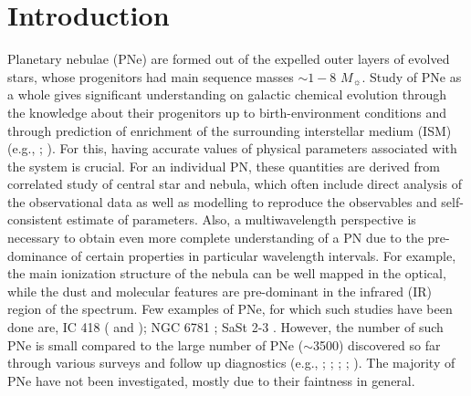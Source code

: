 \documentclass[a4paper,fleqn,usenatbib]{mnras}
\begin{document}
\section{Introduction}
Planetary nebulae (PNe) are formed out of the expelled outer layers of evolved stars, whose progenitors had 
main sequence masses $\sim1-8$ $M_{\sun}$. Study of PNe as a whole gives significant understanding on galactic chemical evolution through the knowledge about their progenitors up to birth-environment conditions and through prediction of enrichment of the surrounding interstellar medium (ISM) (e.g., \citealt{2006ApJ...651..898S}; \citealt{2016MNRAS.461..542G}). For this, having accurate values of physical parameters associated with the system is crucial. For an individual PN, these quantities are derived from correlated study of central star and nebula, which often include direct analysis of the observational data as well as modelling to reproduce the observables and self-consistent estimate of parameters. Also, a multiwavelength perspective is necessary to obtain even more complete understanding of a PN due to the pre-dominance of certain properties in particular wavelength intervals. For example, the main ionization structure of the nebula can be well mapped in the optical, while the dust and molecular features are pre-dominant in the infrared (IR) region of the spectrum. Few examples of PNe, for which such studies have been done are, IC 418 (\citealt{2009A&A...507.1517M} and \citealt{2018A&A...617A..85G}); NGC 6781 \citep{2017ApJS..231...22O}; SaSt 2-3 \citep{2019MNRAS.482.2354O}. However, the number of such PNe is small compared to the large number of PNe ($\sim$3500) discovered so far through various surveys and follow up diagnostics (e.g., \citealt{1992secg.book.....A}; \citealt{2001A&A...378..843K}; \citealt{2006MNRAS.373...79P}; \citealt{2008MNRAS.384..525M}; \citealt{2005MNRAS.362..753D}). The majority of PNe have not been investigated, mostly due to their faintness in general.   
\end{document}
